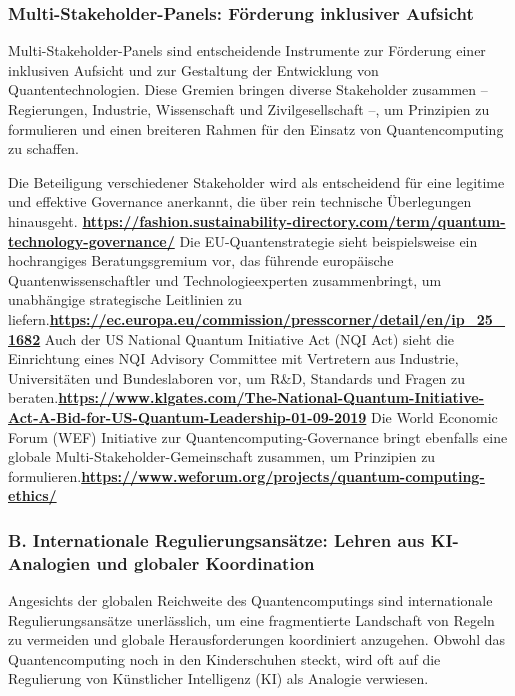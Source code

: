 {\subsubsection{Multi-Stakeholder-Panels: Förderung inklusiver Aufsicht}
Multi-Stakeholder-Panels sind entscheidende Instrumente zur Förderung einer inklusiven Aufsicht und zur Gestaltung der Entwicklung von Quantentechnologien. Diese Gremien bringen diverse Stakeholder zusammen – Regierungen, Industrie, Wissenschaft und Zivilgesellschaft –, um Prinzipien zu formulieren und einen breiteren Rahmen für den Einsatz von Quantencomputing zu schaffen.

Die Beteiligung verschiedener Stakeholder wird als entscheidend für eine legitime und effektive Governance anerkannt, die über rein technische Überlegungen hinausgeht. \textbf{\href{https://fashion.sustainability-directory.com/term/quantum-technology-governance/}{https://fashion.sustainability-directory.com/term/quantum-technology-governance/}} Die EU-Quantenstrategie sieht beispielsweise ein hochrangiges Beratungsgremium vor, das führende europäische Quantenwissenschaftler und Technologieexperten zusammenbringt, um unabhängige strategische Leitlinien zu liefern.\textbf{\href{https://ec.europa.eu/commission/presscorner/detail/en/ip_25_1682}{https://ec.europa.eu/commission/presscorner/detail/en/ip\_25\_1682}} Auch der US National Quantum Initiative Act (NQI Act) sieht die Einrichtung eines NQI Advisory Committee mit Vertretern aus Industrie, Universitäten und Bundeslaboren vor, um R\&D, Standards und Fragen zu beraten.\textbf{\href{https://www.klgates.com/The-National-Quantum-Initiative-Act-A-Bid-for-US-Quantum-Leadership-01-09-2019}{https://www.klgates.com/The-National-Quantum-Initiative-Act-A-Bid-for-US-Quantum-Leadership-01-09-2019}} Die World Economic Forum (WEF) Initiative zur Quantencomputing-Governance bringt ebenfalls eine globale Multi-Stakeholder-Gemeinschaft zusammen, um Prinzipien zu formulieren.\textbf{\href{https://www.weforum.org/projects/quantum-computing-ethics/}{https://www.weforum.org/projects/quantum-computing-ethics/}}

\subsubsection{\textbf{B. Internationale Regulierungsansätze: Lehren aus KI-Analogien und globaler Koordination}}

Angesichts der globalen Reichweite des Quantencomputings sind internationale Regulierungsansätze unerlässlich, um eine fragmentierte Landschaft von Regeln zu vermeiden und globale Herausforderungen koordiniert anzugehen. Obwohl das Quantencomputing noch in den Kinderschuhen steckt, wird oft auf die Regulierung von Künstlicher Intelligenz (KI) als Analogie verwiesen.

}
